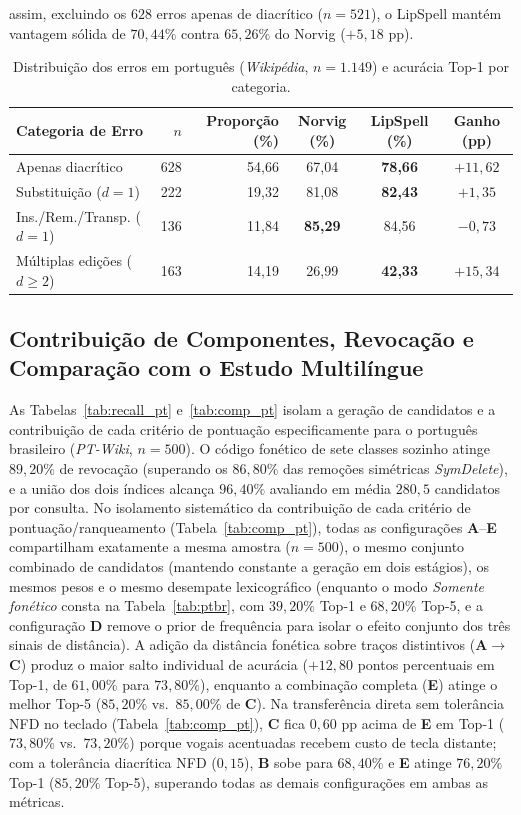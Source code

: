 \documentclass[a4paper, twocolumn, 11pt, twoside]{article}
\begin{document}
assim, excluindo os $628$ erros apenas de diacrítico ($n=521$), o LipSpell mantém vantagem sólida de $70{,}44\%$ contra $65{,}26\%$ do Norvig ($+5{,}18$ pp).

\begin{table}[ht]
\centering
\small
\caption{Distribuição dos erros em português (\textit{Wikipédia}, $n=1.149$) e acurácia Top-1 por categoria.}
\label{tab:pt_error_taxonomy}
\begin{tabular}{lrrccc}
\toprule
Categoria de Erro & $n$ & Proporção (\%) & Norvig (\%) & LipSpell (\%) & Ganho (pp) \\
\midrule
Apenas diacrítico          & 628 & 54,66 & 67,04 & \textbf{78,66} & $+11{,}62$ \\
Substituição ($d=1$)       & 222 & 19,32 & 81,08 & \textbf{82,43} & $+1{,}35$ \\
Ins./Rem./Transp. ($d=1$)  & 136 & 11,84 & \textbf{85,29} & 84,56 & $-0{,}73$ \\
Múltiplas edições ($d\ge 2$)& 163 & 14,19 & 26,99 & \textbf{42,33} & $+15{,}34$ \\
\bottomrule
\end{tabular}
\end{table}

\subsection{Contribuição de Componentes, Revocação e Comparação com o Estudo Multilíngue}
\label{sec:comp_pt}
As Tabelas~\ref{tab:recall_pt} e~\ref{tab:comp_pt} isolam a geração de candidatos e a contribuição de cada critério de pontuação especificamente para o português brasileiro (\textit{PT-Wiki}, $n=500$). O código fonético de sete classes sozinho atinge $89{,}20\%$ de revocação (superando os $86{,}80\%$ das remoções simétricas \textit{SymDelete}), e a união dos dois índices alcança $96{,}40\%$ avaliando em média $280{,}5$ candidatos por consulta. No isolamento sistemático da contribuição de cada critério de pontuação/ranqueamento (Tabela~\ref{tab:comp_pt}), todas as configurações \textbf{A}--\textbf{E} compartilham exatamente a mesma amostra ($n=500$), o mesmo conjunto combinado de candidatos (mantendo constante a geração em dois estágios), os mesmos pesos e o mesmo desempate lexicográfico (enquanto o modo \textit{Somente fonético} consta na Tabela~\ref{tab:ptbr}, com $39{,}20\%$ Top-1 e $68{,}20\%$ Top-5, e a configuração \textbf{D} remove o prior de frequência para isolar o efeito conjunto dos três sinais de distância). A adição da distância fonética sobre traços distintivos (\textbf{A}$\rightarrow$\textbf{C}) produz o maior salto individual de acurácia ($+12{,}80$ pontos percentuais em Top-1, de $61{,}00\%$ para $73{,}80\%$), enquanto a combinação completa (\textbf{E}) atinge o melhor Top-5 ($85{,}20\%$ vs.\ $85{,}00\%$ de \textbf{C}). Na transferência direta sem tolerância NFD no teclado (Tabela~\ref{tab:comp_pt}), \textbf{C} fica $0{,}60$ pp acima de \textbf{E} em Top-1 ($73{,}80\%$ vs.\ $73{,}20\%$) porque vogais acentuadas recebem custo de tecla distante; com a tolerância diacrítica NFD ($0{,}15$), \textbf{B} sobe para $68{,}40\%$ e \textbf{E} atinge $76{,}20\%$ Top-1 ($85{,}20\%$ Top-5), superando todas as demais configurações em ambas as métricas.
\end{document}
